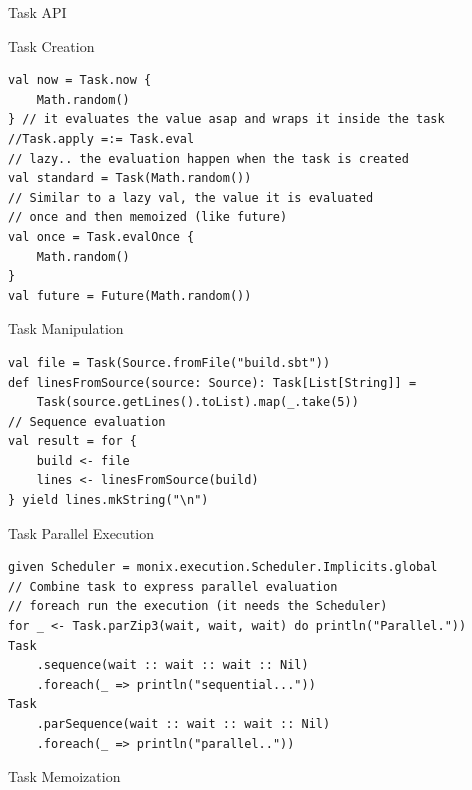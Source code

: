 \documentclass[presentation, 9pt]{beamer}\mode<presentation>{\usetheme{AMSBolognaFC}}
\begin{document}
\begin{frame}{Task API}
	\begin{alertblock}{Task Creation}
		\begin{tcolorbox}[left=0pt, top=0pt, bottom=0pt]
					 \begin{verbatim}
val now = Task.now {
	Math.random()
} // it evaluates the value asap and wraps it inside the task
//Task.apply =:= Task.eval
// lazy.. the evaluation happen when the task is created
val standard = Task(Math.random())
// Similar to a lazy val, the value it is evaluated 
// once and then memoized (like future)
val once = Task.evalOnce {
	Math.random()
}
val future = Future(Math.random())
					 \end{verbatim}
				 \end{tcolorbox}
		 \end{alertblock}
		 \begin{alertblock}{Task Manipulation}
			\begin{tcolorbox}[left=0pt, top=0pt, bottom=0pt]
						 \begin{verbatim}
val file = Task(Source.fromFile("build.sbt"))
def linesFromSource(source: Source): Task[List[String]] = 
	Task(source.getLines().toList).map(_.take(5))
// Sequence evaluation
val result = for {
	build <- file
	lines <- linesFromSource(build)
} yield lines.mkString("\n")
						 \end{verbatim}
					 \end{tcolorbox}
			 \end{alertblock}
			 \begin{alertblock}{Task Parallel Execution}
				\begin{tcolorbox}[left=0pt, top=0pt, bottom=0pt]
							 \begin{verbatim}
given Scheduler = monix.execution.Scheduler.Implicits.global
// Combine task to express parallel evaluation
// foreach run the execution (it needs the Scheduler)
for _ <- Task.parZip3(wait, wait, wait) do println("Parallel."))
Task
	.sequence(wait :: wait :: wait :: Nil)
	.foreach(_ => println("sequential..."))
Task
	.parSequence(wait :: wait :: wait :: Nil)
	.foreach(_ => println("parallel.."))
							 \end{verbatim}
						 \end{tcolorbox}
				 \end{alertblock}
				 \begin{alertblock}{Task Memoization}
					\begin{tcolorbox}[left=0pt, top=0pt, bottom=0pt]

\end{tcolorbox}
\end{alertblock}
\end{frame}
\end{document}
